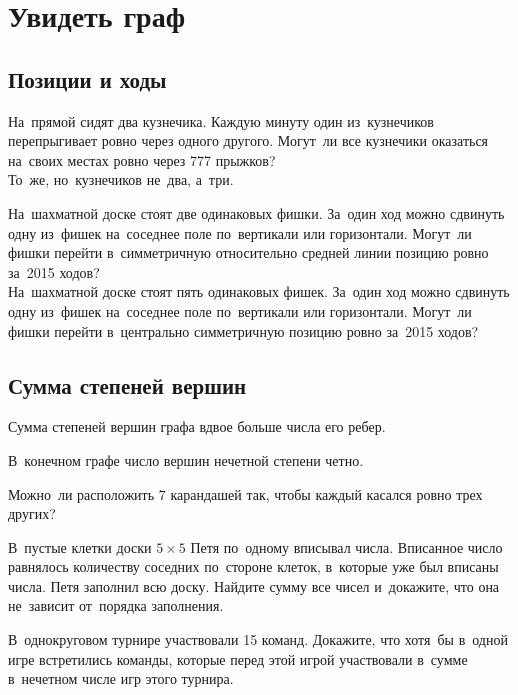
\section*{Увидеть граф}



\subsection*{Позиции и ходы}

\begin{problems}

\item
\sp
На~прямой сидят два кузнечика.
Каждую минуту один из~кузнечиков перепрыгивает ровно через одного другого.
Могут~ли все кузнечики оказаться на~своих местах ровно через 777 прыжков?
\\
\sp
То~же, но~кузнечиков не~два, а~три.

\item
\sp
На~шахматной доске стоят две одинаковых фишки.
За~один ход можно сдвинуть одну из~фишек на~соседнее поле по~вертикали или
горизонтали.
Могут~ли фишки перейти в~симметричную относительно средней линии позицию ровно
за~2015 ходов?
\\
\sp
На~шахматной доске стоят пять одинаковых фишек.
За~один ход можно сдвинуть одну из~фишек на~соседнее поле по~вертикали или
горизонтали.
Могут~ли фишки перейти в~центрально симметричную позицию ровно за~2015 ходов?

\end{problems}

\subsection*{Сумма степеней вершин}

Сумма степеней вершин графа вдвое больше числа его ребер.

В~конечном графе число вершин нечетной степени четно. 

\begin{problems}

\item
Можно~ли расположить 7 карандашей так, чтобы каждый касался ровно трех других?

\item
В~пустые клетки доски $5 \times 5$ Петя по~одному вписывал числа.
Вписанное число равнялось количеству соседних по~стороне клеток, в~которые уже
был вписаны числа.
Петя заполнил всю доску.
Найдите сумму все чисел и~докажите, что она не~зависит от~порядка заполнения.

\item
В~однокруговом турнире участвовали 15 команд.
Докажите, что хотя~бы в~одной игре встретились команды, которые перед этой
игрой участвовали в~сумме в~нечетном числе игр этого турнира.

\end{problems}

